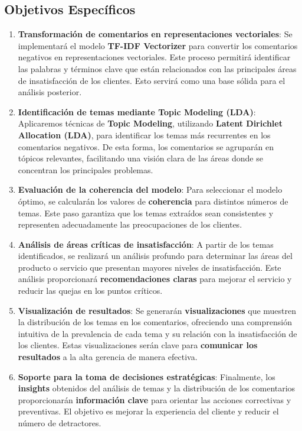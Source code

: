 \documentclass{matematicasud}
\begin{document}
\subsection{Objetivos Específicos}
\begin{enumerate}
    \item \textbf{Transformación de comentarios en representaciones vectoriales}: 
    Se implementará el modelo \textbf{TF-IDF Vectorizer} para convertir los comentarios negativos en representaciones vectoriales. Este proceso permitirá identificar las palabras y términos clave que están relacionados con las principales áreas de insatisfacción de los clientes. Esto servirá como una base sólida para el análisis posterior.

    \item \textbf{Identificación de temas mediante Topic Modeling (LDA)}: 
    Aplicaremos técnicas de \textbf{Topic Modeling}, utilizando \textbf{Latent Dirichlet Allocation (LDA)}, para identificar los temas más recurrentes en los comentarios negativos. De esta forma, los comentarios se agruparán en tópicos relevantes, facilitando una visión clara de las áreas donde se concentran los principales problemas.

    \item \textbf{Evaluación de la coherencia del modelo}: 
    Para seleccionar el modelo óptimo, se calcularán los valores de \textbf{coherencia} para distintos números de temas. Este paso garantiza que los temas extraídos sean consistentes y representen adecuadamente las preocupaciones de los clientes.

    \item \textbf{Análisis de áreas críticas de insatisfacción}: 
    A partir de los temas identificados, se realizará un análisis profundo para determinar las áreas del producto o servicio que presentan mayores niveles de insatisfacción. Este análisis proporcionará \textbf{recomendaciones claras} para mejorar el servicio y reducir las quejas en los puntos críticos.

    \item \textbf{Visualización de resultados}: 
    Se generarán \textbf{visualizaciones} que muestren la distribución de los temas en los comentarios, ofreciendo una comprensión intuitiva de la prevalencia de cada tema y su relación con la insatisfacción de los clientes. Estas visualizaciones serán clave para \textbf{comunicar los resultados} a la alta gerencia de manera efectiva.

    \item \textbf{Soporte para la toma de decisiones estratégicas}: 
    Finalmente, los \textbf{insights} obtenidos del análisis de temas y la distribución de los comentarios proporcionarán \textbf{información clave} para orientar las acciones correctivas y preventivas. El objetivo es mejorar la experiencia del cliente y reducir el número de detractores.
\end{enumerate}
\end{document}
